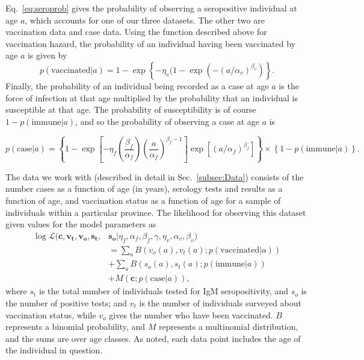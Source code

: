 \documentclass[nofootinbib,aps,pre,twocolumn,superscriptaddress,showkeys,showpacs]{revtex4-1}
\begin{document}
Eq.~\ref{eq:seroprob} gives the probability of observing a seropositive individual at age $a$, which accounts for one of our three datasets. The other two are vaccination data and case data. Using the function described above for vaccination hazard, the probability of an individual having been vaccinated by age $a$ is given by
\begin{equation}
p(\mathrm{vaccinated}|a) = 1 - \exp \left\{ - \eta_v (1-\exp\left(-(a/\alpha_v)^{\beta_v}\right) \right\}.
\end{equation}
Finally, the probability of an individual being recorded as a case at age $a$ is the force of infection at that age multiplied by the probability that an individual is susceptible at that age. The probability of susceptibility is of course $1 - p(\mathrm{immune}|a)$, and so the probability of observing a case at age $a$ is
\begin{widetext}
\begin{equation}
p(\mathrm{case}|a) = \left\{ 1 - \exp\left[ -\eta_f \left( \frac{\beta_f}{\alpha_f}\right)\left(\frac{a}{\alpha_f}\right)^{\beta_f - 1}\right] \exp\left[ (a/\alpha_f)^{\beta_f}\right] \right\}
\times \left\{ 1-p(\mathrm{immune}|a)\right\}.
\end{equation}
\end{widetext}

The data we work with (described in detail in Sec.~\ref{subsec:Data}) consists of the number cases as a function of age (in years), serology tests and results as a function of age, and vaccination status as a function of age for a sample of individuals within a particular province. The likelihood for observing this dataset given values for the model parameters as
\begin{align}
\log \mathcal{L} (\mathbf{c}, \mathbf{v_t}, \mathbf{v_o}, \mathbf{s_t},&\mathbf{s_o}|\eta_f, \alpha_f, \beta_f, \gamma, \eta_v, \alpha_v, \beta_v)\nonumber \\ 
& = \sum_aB\left(v_o(a), v_t(a); p(\mathrm{vaccinated}|a)\right) \nonumber \\
&+ \sum_a B\left(s_o(a),s_t(a);p(\mathrm{immune}|a)\right) \nonumber \\
&+ M\left(\mathbf{c};p(\mathrm{case}|a)\right),
\label{eq:loglike}
\end{align}
where $s_t$ is the total number of individuals tested for IgM seropositivity, and $s_o$ is the number of positive tests; and $v_t$ is the number of individuals surveyed about vaccination status, while $v_o$ gives the number who have been vaccinated. $B$ represents a binomial probability, and $M$ represents a multinomial distribution, and the sums are over age classes. As noted, each data point includes the age of the individual in question.
\end{document}
